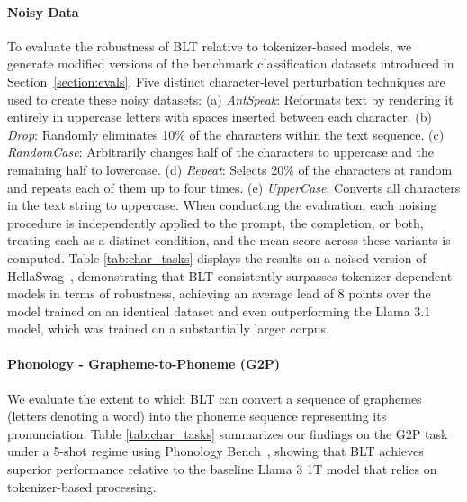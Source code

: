 \paragraph{Noisy Data} To evaluate the robustness of {\textsc BLT} relative to tokenizer-based models, we generate modified versions of the benchmark classification datasets introduced in Section~\ref{section:evals}. Five distinct character-level perturbation techniques are used to create these noisy datasets: (a) \textit{AntSpeak}: Reformats text by rendering it entirely in uppercase letters with spaces inserted between each character. (b) \textit{Drop}: Randomly eliminates 10\% of the characters within the text sequence. (c) \textit{RandomCase}: Arbitrarily changes half of the characters to uppercase and the remaining half to lowercase. (d) \textit{Repeat}: Selects 20\% of the characters at random and repeats each of them up to four times. (e) \textit{UpperCase}: Converts all characters in the text string to uppercase. When conducting the evaluation, each noising procedure is independently applied to the prompt, the completion, or both, treating each as a distinct condition, and the mean score across these variants is computed. Table \ref{tab:char_tasks} displays the results on a noised version of HellaSwag~\citep{Eval_hellaswag}, demonstrating that {\textsc BLT} consistently surpasses tokenizer-dependent models in terms of robustness, achieving an average lead of 8 points over the model trained on an identical dataset and even outperforming the Llama 3.1 model, which was trained on a substantially larger corpus.

\paragraph{Phonology - Grapheme-to-Phoneme (G2P)} We evaluate the extent to which {\textsc BLT} can convert a sequence of graphemes (letters denoting a word) into the phoneme sequence representing its pronunciation. Table \ref{tab:char_tasks} summarizes our findings on the G2P task under a 5-shot regime using Phonology Bench~\citep{suvarna2024phonologybench}, showing that {\textsc BLT} achieves superior performance relative to the baseline Llama 3 1T model that relies on tokenizer-based processing.

